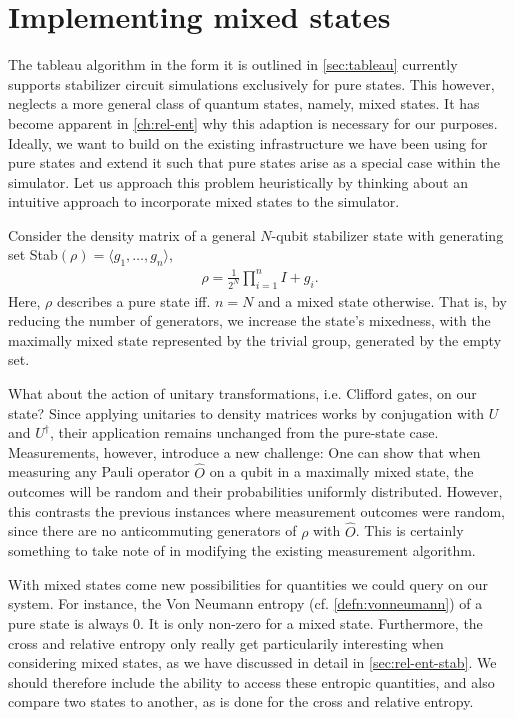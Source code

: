 \section{Implementing mixed states}\label{sec:mixed-states}
The tableau algorithm in the form it is outlined in \cref{sec:tableau}
currently supports stabilizer circuit simulations exclusively for pure states.
This however,
neglects a more general class of quantum states, namely, mixed states. It has
become apparent in \cref{ch:rel-ent} why this adaption is necessary for our
purposes. Ideally, we want to build on the existing infrastructure we have been
using for pure states and extend it such that pure states arise as a special
case within the simulator. 
Let us approach this problem
heuristically by thinking about an intuitive approach to incorporate mixed
states to the simulator.

Consider the density matrix of a general $N$-qubit stabilizer
state with generating set Stab$\left( \rho \right) = \langle g_1, \ldots, g_n
\rangle$,
\begin{align}
  \rho = \frac{1}{2^N} \prod_{i=1}^n I + g_i
.\end{align}
Here, $\rho$ describes a pure state iff. $n=N$ and a mixed state otherwise.
That is, by reducing the number of generators, we increase the state's
mixedness, with the maximally mixed state represented by the trivial group,
generated by the empty set.

What about the action of unitary transformations, i.e. Clifford gates, on our
state? Since applying unitaries to density matrices works by conjugation with
$U$ and $U^\dagger$, their application remains unchanged from the pure-state
case. Measurements, however, introduce a new challenge:
One can show that when measuring any
Pauli operator $\hat{O}$ on a qubit in a maximally mixed state, the outcomes
will be random and their probabilities uniformly distributed. However, this
contrasts the previous instances where measurement outcomes were random, since
there are no anticommuting generators of $\rho$ with $\hat{O}$. This is
certainly something to take note of in modifying the existing measurement
algorithm.

With mixed states come new possibilities for quantities we could query on our
system. For instance, the Von Neumann entropy (cf. \cref{defn:vonneumann}) of a
pure state is always $0$. It is only non-zero for a mixed state.
Furthermore, the cross and relative entropy only
really get particularily interesting when considering mixed states, as we have
discussed in detail in \cref{sec:rel-ent-stab}. We should therefore include the
ability to access these entropic quantities, and also compare two states to
another, as is done for the cross and relative entropy.

